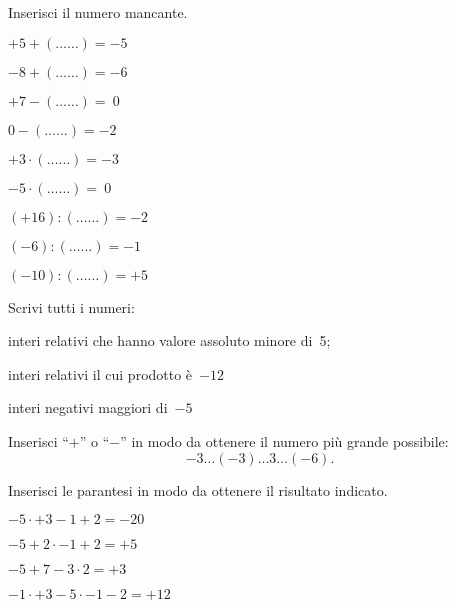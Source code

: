 \begin{esercizio}
Inserisci il numero mancante.
 \begin{multicols}{3}
 \begin{enumeratea}
 \item \(+5 + (\ldots\ldots) = -5\)
 \item \(-8 + (\ldots\ldots) = -6\)
 \item \(+7 - (\ldots\ldots) =~0\)
 \item \(0 - (\ldots\ldots) = -2\)
 \item \(+3\cdot (\ldots\ldots) = -3\)
 \item \(-5\cdot (\ldots\ldots) =~0\)
 \item \((+16): (\ldots\ldots) = -2\)
 \item \((-6): (\ldots\ldots) = -1\)
 \item \((-10): (\ldots\ldots) = +5\)
 \end{enumeratea}
 \end{multicols}
\end{esercizio}

\begin{esercizio}
 Scrivi tutti i numeri:
 \begin{enumeratea}
 \item interi relativi che hanno valore assoluto minore di~5;
 \item interi relativi il cui prodotto è~\(-12\)
 \item interi negativi maggiori di~\(-5\)
 \end{enumeratea}
\end{esercizio}

\begin{esercizio}
Inserisci ``\(+\)'' o ``\(-\)'' in modo da ottenere il numero più grande possibile:
 \[-3\ldots(-3)\ldots3\ldots(-6).\]
\end{esercizio}

\begin{esercizio}
Inserisci le parantesi in modo da ottenere il risultato indicato.
 \begin{multicols}{2}
 \begin{enumeratea}
 \item \(-5 \cdot +3-1+2=-20\)
 \item \(-5+2\cdot-1+2=+5\)
 \item \(-5+7-3\cdot 2=+3\)
 \item \(-1\cdot +3-5\cdot -1-2=+12\)
 \end{enumeratea}
 \end{multicols}
\end{esercizio}

